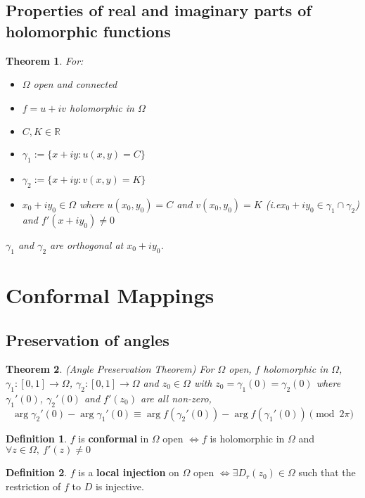 \documentclass[12pt]{article}
\newtheorem{thm}{Theorem}[section]
\theoremstyle{definition}
\newtheorem{defn}{Definition}[section]
\newcommand{\R}{\mathbb{R}}
\begin{document}
\subsection{Properties of real and imaginary parts of holomorphic functions}

\begin{thm}
  For:
  \begin{itemize}
    \item $\Omega$ open and connected
    \item $f = u + iv$ holomorphic in $\Omega$
    \item $C, K \in \R$
    \item $\gamma_1 := \{x + iy : u(x, y) = C\}$
    \item $\gamma_2 := \{x + iy : v(x, y) = K\}$
    \item $x_0 + iy_0 \in \Omega$ where $u(x_0, y_0) = C$ and $v(x_0, y_0) = K$ (i.e\@ $x_0 + iy_0 \in \gamma_1 \cap \gamma_2$) and $f'(x + iy_0) \neq 0$
  \end{itemize}
  $\gamma_1$ and $\gamma_2$ are orthogonal at $x_0 + iy_0$.
\end{thm}

\section{Conformal Mappings}

\subsection{Preservation of angles}

\begin{thm}
  (Angle Preservation Theorem)
  For $\Omega$ open, $f$ holomorphic in $\Omega$, $\gamma_1 : [0, 1] \to \Omega$, $\gamma_2 : [0, 1] \to \Omega$ and $z_0 \in \Omega$ with $z_0 = \gamma_1(0) = \gamma_2(0)$ where $\gamma_1'(0)$, $\gamma_2'(0)$ and $f'(z_0)$ are all non-zero,
  $$\arg{\gamma_2'(0)} - \arg{\gamma_1'(0)} \equiv \arg{f(\gamma_2'(0))} - \arg{f(\gamma_1'(0))} \pmod {2\pi}$$
\end{thm}

\begin{defn}
  $f$ is \textbf{conformal} in $\Omega$ open $\iff f$ is holomorphic in $\Omega$ and $\forall z \in \Omega,\ f'(z) \neq 0$
\end{defn}

\begin{defn}
  $f$ is a \textbf{local injection} on $\Omega$ open $\iff \exists D_r(z_0) \in \Omega$ such that the restriction of $f$ to $D$ is injective.
\end{defn}
\end{document}
